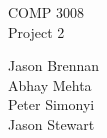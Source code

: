 \documentclass[11pt]{article}
\begin{document}
\begin{titlepage}

COMP 3008\\
Project 2

Jason Brennan\\
Abhay Mehta\\
Peter Simonyi\\
Jason Stewart

\end{titlepage}

\section{}
\end{document}
